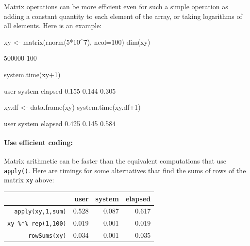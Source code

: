 \documentclass{tufte-book}\usepackage[]{graphicx}\usepackage[]{color}
\newcommand{\txtt}[1]{\texttt{#1}}
\begin{document}
Matrix operations can be more efficient even for such a simple
operation as adding a constant quantity to each element of the array,
or taking logarithms of all elements.  Here is an
example:
\begin{Schunk}
\begin{Sinput}
xy <- matrix(rnorm(5*10^7), ncol=100)
dim(xy)
\end{Sinput}
\begin{Soutput}
[1] 500000    100
\end{Soutput}
\end{Schunk}
\begin{Schunk}
\begin{Sinput}
system.time(xy+1)
\end{Sinput}
\begin{Soutput}
   user  system elapsed 
  0.155   0.144   0.305 
\end{Soutput}
\begin{Sinput}
xy.df <- data.frame(xy)
system.time(xy.df+1)
\end{Sinput}
\begin{Soutput}
   user  system elapsed 
  0.425   0.145   0.584 
\end{Soutput}
\end{Schunk}
\vspace*{-12pt}

\paragraph{Use efficient coding:}
Matrix arithmetic can be faster than the equivalent computations
that use \txtt{apply()}. Here are timings for some alternatives that
find the sums of rows of the matrix \txtt{xy} above:\\[-4pt]

\begin{center}
\begin{tabular}{rrrr}
  \hline
 & user & system & elapsed \\
  \hline
\txtt{apply(xy,1,sum)}      & 0.528 & 0.087 & 0.617 \\
 \txtt{xy \%*\% rep(1,100)} & 0.019 & 0.001 & 0.019 \\
 \txtt{rowSums(xy)}         & 0.034 & 0.001 & 0.035 \\
   \hline
\end{tabular}
\end{center}
\vspace*{-9pt}
\end{document}
